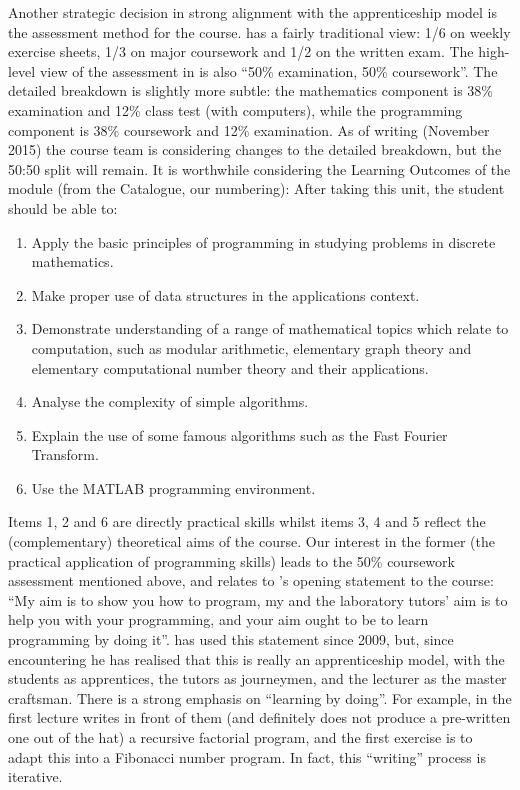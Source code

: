 \documentclass[conference,compsoc]{IEEEtran}
\begin{document}
Another strategic decision in strong alignment with the apprenticeship model is the assessment method for the course. \BathC{} has a fairly traditional view: 1/6 on weekly exercise sheets, 1/3 on major coursework and 1/2 on the written exam. The high-level view of the assessment in \BathM{} is also ``50\% examination, 50\% coursework''. The detailed breakdown is slightly more subtle: the mathematics component is 38\% examination and 12\% class test (with computers), while the programming component is 38\% coursework and 12\% examination. As of writing (November 2015) the course team is considering changes to the detailed breakdown, but the 50:50 split will remain.
It is worthwhile considering the Learning Outcomes of the module (from the Catalogue, our numbering):
After taking this unit, the student should be able to:
\begin{enumerate}
\item   Apply the basic principles of programming in studying problems in discrete mathematics.
\item   Make proper use of data structures in the applications context.
\item   Demonstrate understanding of a range of mathematical topics which relate to computation, such as modular arithmetic, elementary graph theory and elementary computational number theory and their applications.
\item   Analyse the complexity of simple algorithms.
\item   Explain the use of some famous algorithms such as the Fast Fourier Transform.
\item   Use the MATLAB programming environment.
 \end{enumerate}

 Items 1, 2 and 6 are directly practical skills whilst items 3, 4 and 5 reflect the (complementary) theoretical aims of the course. Our interest in the former (the practical application of programming skills) leads to the 50\% coursework assessment mentioned above, and relates to \JHD's opening statement to the course: ``My aim is to show you how to program, my and the laboratory tutors' aim is to help you with your programming, and your aim ought to be to learn programming by doing it''. \JHD{} has used this statement since 2009, but, since encountering \cite{Viha} he has realised that this is really an apprenticeship model, with the students as apprentices, the tutors as journeymen, and the lecturer as the master craftsman. There is a strong emphasis on ``learning by doing''. For example, in the first lecture \JHD{} writes in front of them (and definitely does not produce a pre-written one out of the hat) a recursive factorial program, and the first exercise is to adapt this into a Fibonacci number program. In fact, this ``writing'' process is iterative.
\end{document}
